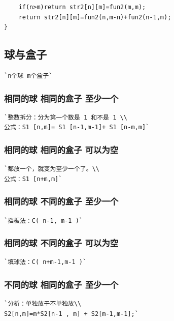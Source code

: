 \documentclass[a4paper]{article}
\begin{document}
\begin{CJK*}{UTF8}{gbsn}
\begin{multicols}{3}
\begin{flushleft}
\begin{lstlisting}
    if(n>m)return str2[n][m]=fun2(m,m);
    return str2[n][m]=fun2(n,m-n)+fun2(n-1,m);
}

\end{lstlisting}



\subsection{球与盒子}
\begin{lstlisting}
`n个球 m个盒子`
\end{lstlisting}


\subsubsection{相同的球 相同的盒子 至少一个}
\begin{lstlisting}
`整数拆分：分为第一个数是 1 和不是 1 \\
公式：S1 [n,m]= S1 [n-1,m-1]+ S1 [n-m,m]`
\end{lstlisting}

\subsubsection{相同的球 相同的盒子 可以为空}
\begin{lstlisting}
`都放一个，就变为至少一个了。\\
公式：S1 [n+m,m]`
\end{lstlisting}

\subsubsection{相同的球 不同的盒子 至少一个}
\begin{lstlisting}
`挡板法：C( n-1, m-1 )`
\end{lstlisting}

\subsubsection{相同的球 不同的盒子 可以为空}
\begin{lstlisting}
`填球法：C( n+m-1,m-1 )`
\end{lstlisting}

\subsubsection{不同的球 相同的盒子 至少一个}
\begin{lstlisting}
`分析：单独放于不单独放\\
S2[n,m]=m*S2[n-1 , m] + S2[m-1,m-1];`
\end{lstlisting}


\end{flushleft}
\end{multicols}
\end{CJK*}
\end{document}

